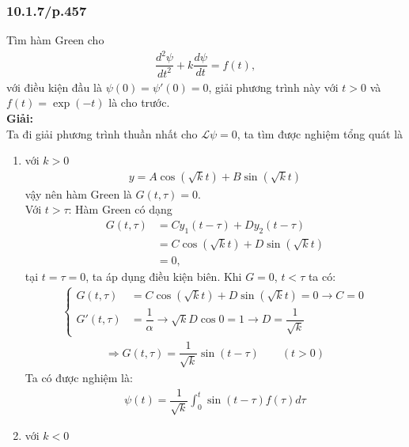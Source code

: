 \documentclass{report}
\newcommand{\f}[2]{\dfrac{#1}{#2}}
\begin{document}
\subsubsection{10.1.7/p.457}
Tìm hàm Green cho
\begin{align*}
	\f{d^2 \psi}{dt^2} + k \f{d\psi}{dt} = f(t),
\end{align*}
với điều kiện đầu là $\psi(0) = \psi'(0) = 0$, giải phương trình này với $t > 0$ và $f(t) = \exp(-t)$ là cho trước. \\

\textbf{Giải:}\\
Ta đi giải phương trình thuần nhất cho $\mathcal{L} \psi = 0$, ta tìm được nghiệm tổng quát là
\begin{enumerate}[label=(\alph*)]
	\item với $k > 0$
	      \begin{align*}
		      y = A \cos(\sqrt{k} t) + B \sin(\sqrt{k} t)
	      \end{align*}
	      vậy nên hàm Green là $G(t,\tau) = 0$.\\
	      Với $t > \tau$: Hàm Green có dạng
	      \begin{align*}
		      G(t,\tau)
		       & = C y_1(t - \tau) + Dy_2(t - \tau)        \\
		       & = C \cos(\sqrt{k} t) + D \sin(\sqrt{k} t) \\
		       & = 0,
	      \end{align*}
	      tại $t = \tau = 0$, ta áp dụng điều kiện biên. Khi $G =0$, $t<\tau$ ta có:
	      \begin{align*}
		      \begin{cases}
			      G(t,\tau)  & = C \cos(\sqrt{k} t) + D \sin(\sqrt{k} t) = 0 \rightarrow C = 0                   \\
			      G'(t,\tau) & = \f{1}{\alpha} \rightarrow \sqrt{k} D \cos 0 = 1 \rightarrow D = \f{1}{\sqrt{k}}
		      \end{cases}
	      \end{align*}
	      \begin{align*}
		      \Rightarrow G(t,\tau) = \f{1}{\sqrt{k}} \sin (t - \tau)  \quad \quad (t > 0)
	      \end{align*}
	      Ta có được nghiệm là:
	      \begin{align*}
		      \psi(t) = \f{1}{\sqrt{k}} \int_{0}^{t} \sin(t-\tau) f(\tau) d\tau
	      \end{align*}
	\item  với $k < 0$\\

\end{enumerate}
\end{document}
